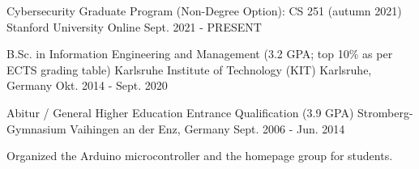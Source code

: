 

\begin{cventries}

  \cventry
    {Cybersecurity Graduate Program (Non-Degree Option): CS 251 (autumn 2021)} %
    {Stanford University} %
    {Online} %
    {Sept. 2021 - PRESENT} %
    {}

  \cventry
    {B.Sc. in Information Engineering and Management (3.2 GPA; top 10\% as per ECTS grading table)} %
    {Karlsruhe Institute of Technology (KIT) } %
    {Karlsruhe, Germany} %
    {Okt. 2014 - Sept. 2020} %
    {}
  
  \cventry
    {Abitur / General Higher Education Entrance Qualification  (3.9 GPA)} %
    {Stromberg-Gymnasium} %
    {Vaihingen an der Enz, Germany} %
    {Sept. 2006 - Jun. 2014} %
    {
      \begin{cvitems} %
        \item {Organized the Arduino microcontroller and the homepage group for students.}
      \end{cvitems}
    }

\end{cventries}
